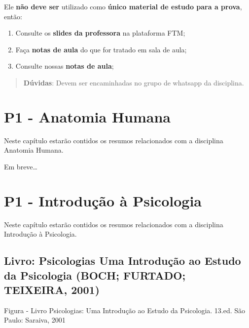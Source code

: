 \documentclass[
]{book}
\providecommand{\tightlist}{%
  \setlength{\itemsep}{0pt}\setlength{\parskip}{0pt}}
\begin{document}
Ele \textbf{não deve ser} utilizado como \textbf{único material de estudo para a prova}, então:

\begin{enumerate}
\def\labelenumi{\arabic{enumi}.}
\tightlist
\item
  Consulte os \textbf{slides da professora} na plataforma FTM;\\
\item
  Faça \textbf{notas de aula} do que for tratado em sala de aula;\\
\item
  Consulte nossas \textbf{notas de aula};
\end{enumerate}

\begin{quote}
\textbf{Dúvidas}: Devem ser encaminhadas no grupo de whatsapp da disciplina.
\end{quote}

\hypertarget{p1---anatomia-humana}{%
\chapter{P1 - Anatomia Humana}\label{p1---anatomia-humana}}

Neste capítulo estarão contidos os resumos relacionados com a disciplina Anatomia Humana.

Em breve\ldots{}

\hypertarget{p1---introduuxe7uxe3o-uxe0-psicologia}{%
\chapter{P1 - Introdução à Psicologia}\label{p1---introduuxe7uxe3o-uxe0-psicologia}}

Neste capítulo estarão contidos os resumos relacionados com a disciplina Introdução à Psicologia.

\hypertarget{livro-psicologias-uma-introduuxe7uxe3o-ao-estudo-da-psicologia-boch-furtado-teixeira-2001}{%
\section{\texorpdfstring{Livro: \textbf{Psicologias Uma Introdução ao Estudo da Psicologia} (BOCH; FURTADO; TEIXEIRA, 2001)}{Livro: Psicologias Uma Introdução ao Estudo da Psicologia (BOCH; FURTADO; TEIXEIRA, 2001)}}\label{livro-psicologias-uma-introduuxe7uxe3o-ao-estudo-da-psicologia-boch-furtado-teixeira-2001}}

Figura - Livro Psicologias: Uma Introdução ao Estudo da Psicologia. 13.ed. São Paulo: Saraiva, 2001
\end{document}
